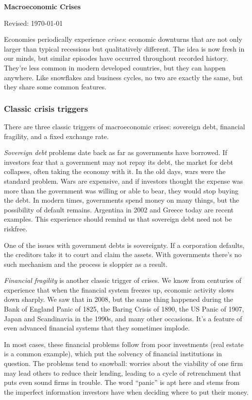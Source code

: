 \documentclass[letterpaper,12pt]{article}
\def\HeadName{Macroeconomic Crises}
\begin{document}
\thispagestyle{empty}%
\Head

\centerline{\large \bf \HeadName}%
\centerline{Revised: \today}

\bigskip
Economies periodically experience {\it crises\/}:
economic downturns that are not only larger than typical recessions
but qualitatively different.
The idea is now fresh in our minds,
but similar episodes have occurred throughout recorded history.
They're less common in modern developed countries,
but they can happen anywhere.
Like snowflakes and business cycles, no two are exactly the same,
but they share some common features.


\subsubsection*{Classic crisis triggers}

There are three classic triggers of macroeconomic crises:
sovereign debt, financial fragility, and a fixed exchange rate.

{\it Sovereign debt\/} problems date back as far as governments have borrowed.
If investors fear that a government may not repay its debt,
the market for debt collapses, often taking the economy with it.
In the old days, wars were the standard problem.
Wars are expensive, and if investors thought the expense was more
than the government was willing or able to bear,
they would stop buying the debt.
In modern times, governments spend money on many things,
but the possibility of default remains.
Argentina in 2002 and Greece today are recent examples.
This experience should remind us that sovereign debt
need not be riskfree.

One of the issues with government debts is sovereignty.
If a corporation defaults, the creditors take it to court
and claim the assets.
With governments there's no such mechanism and the process
is sloppier as a result.

{\it Financial fragility\/} is another classic trigger of crises.
We know from centuries of experience that when the
financial system freezes up,
economic activity slows down sharply.
We saw that in 2008,
but the same thing happened during the Bank of England Panic of 1825,
the Baring Crisis of 1890,
the US Panic of 1907,
Japan and Scandinavia in the 1990s,
and many other occasions.
It's a feature of even advanced financial systems that they
sometimes implode.

In most cases, these financial problems follow from
poor investments (real estate is a common example),
which put the solvency of financial institutions in question.
The problems tend to snowball:
worries about the viability of one firm may lead others to
reduce their lending, leading to a cycle of retrenchment
that puts even sound firms in trouble.
The word ``panic'' is apt here and stems
from the imperfect information investors have
when deciding where to put their money.
\end{document}
